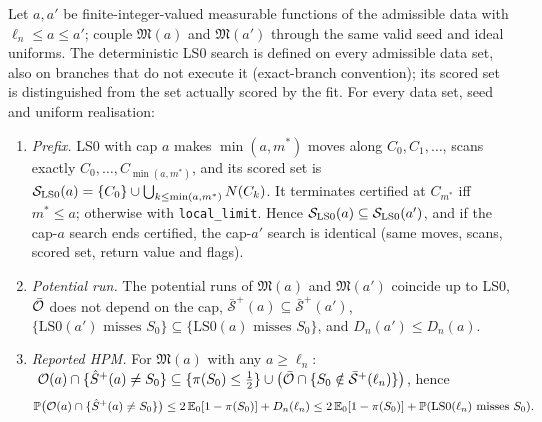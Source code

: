 \begin{lemma}\label{lem:cap}
Let $a,a'$ be finite-integer-valued measurable functions of the admissible data with $\ell_n\le a\le a'$; couple $\mathfrak M(a)$ and $\mathfrak M(a')$ through the same valid seed and ideal uniforms. The deterministic LS0 search is defined on every admissible data set, also on branches that do not execute it (exact-branch convention); its scored set is distinguished from the set actually scored by the fit. For every data set, seed and uniform realisation:
\begin{enumerate}
\item[(a)] \emph{Prefix.} LS0 with cap $a$ makes $\min(a,m^*)$ moves along $C_0,C_1,\dots$, scans exactly $C_0,\dots,C_{\min(a,m^*)}$, and its scored set is $\mathcal S_{\rm LS0}(a)=\{C_0\}\cup\bigcup_{k\le\min(a,m^*)}N(C_k)$. It terminates certified at $C_{m^*}$ iff $m^*\le a$; otherwise with \texttt{local\_limit}. Hence $\mathcal S_{\rm LS0}(a)\subseteq\mathcal S_{\rm LS0}(a')$, and if the cap-$a$ search ends certified, the cap-$a'$ search is identical (same moves, scans, scored set, return value and flags).
\item[(b)] \emph{Potential run.} The potential runs of $\mathfrak M(a)$ and $\mathfrak M(a')$ coincide up to LS0, $\bar{\mathcal O}$ does not depend on the cap, $\bar{\mathcal S}^{+}(a)\subseteq\bar{\mathcal S}^{+}(a')$, $\{\text{LS0}(a')\text{ misses }S_0\}\subseteq\{\text{LS0}(a)\text{ misses }S_0\}$, and $D_n(a')\le D_n(a)$.
\item[(c)] \emph{Reported HPM.} For $\mathfrak M(a)$ with any $a\ge\ell_n$:
$\ \mathcal O(a)\cap\{\hat S^{+}(a)\ne S_0\}\subseteq\{\pi(S_0)\le\tfrac12\}\cup\bigl(\bar{\mathcal O}\cap\{S_0\notin\bar{\mathcal S}^{+}(\ell_n)\}\bigr)$, hence
\[
\mathbb P\bigl(\mathcal O(a)\cap\{\hat S^{+}(a)\ne S_0\}\bigr)\le2\,\mathbb E_0[1-\pi(S_0)]+D_n(\ell_n)\le2\,\mathbb E_0[1-\pi(S_0)]+\mathbb P(\text{LS0}(\ell_n)\text{ misses }S_0).
\]
\end{enumerate}
\end{lemma}
